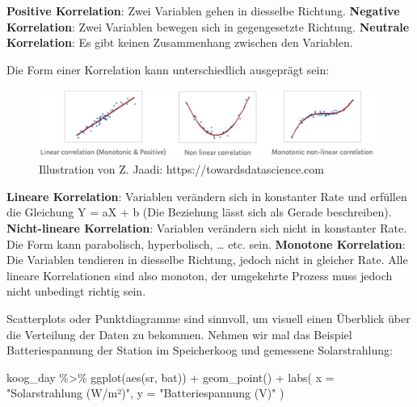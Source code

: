 \documentclass[
]{article}
\newenvironment{Shaded}{\begin{snugshade}}{\end{snugshade}}
\newcommand{\AttributeTok}[1]{\textcolor[rgb]{0.77,0.63,0.00}{#1}}
\newcommand{\FunctionTok}[1]{\textcolor[rgb]{0.00,0.00,0.00}{#1}}
\newcommand{\NormalTok}[1]{#1}
\newcommand{\SpecialCharTok}[1]{\textcolor[rgb]{0.00,0.00,0.00}{#1}}
\newcommand{\StringTok}[1]{\textcolor[rgb]{0.31,0.60,0.02}{#1}}
\begin{document}
\textbf{Positive Korrelation}: Zwei Variablen gehen in diesselbe Richtung.
\textbf{Negative Korrelation}: Zwei Variablen bewegen sich in gegengesetzte Richtung.
\textbf{Neutrale Korrelation}: Es gibt keinen Zusammenhang zwischen den Variablen.

Die Form einer Korrelation kann unterschiedlich ausgeprägt sein:

\begin{figure}

{\centering \includegraphics[width=9.72in]{images/056} 

}

\caption{Illustration von Z. Jaadi: https://towardsdatascience.com}\label{fig:unnamed-chunk-259}
\end{figure}

\textbf{Lineare Korrelation}: Variablen verändern sich in konstanter Rate und erfüllen die Gleichung Y = aX + b (Die Beziehung lässt sich als Gerade beschreiben).
\textbf{Nicht-lineare Korrelation}: Variablen verändern sich nicht in konstanter Rate. Die Form kann parabolisch, hyperbolisch, \ldots{} etc. sein.
\textbf{Monotone Korrelation}: Die Variablen tendieren in diesselbe Richtung, jedoch nicht in gleicher Rate. Alle lineare Korrelationen sind also monoton, der umgekehrte Prozess muss jedoch nicht unbedingt richtig sein.

Scatterplots oder Punktdiagramme sind sinnvoll, um visuell einen Überblick über die Verteilung der Daten zu bekommen. Nehmen wir mal das Beispiel Batteriespannung der Station im Speicherkoog und gemessene Solarstrahlung:

\begin{Shaded}
\begin{Highlighting}[]
\NormalTok{koog\_day }\SpecialCharTok{\%\textgreater{}\%}
  \FunctionTok{ggplot}\NormalTok{(}\FunctionTok{aes}\NormalTok{(sr, bat)) }\SpecialCharTok{+}
  \FunctionTok{geom\_point}\NormalTok{() }\SpecialCharTok{+}
  \FunctionTok{labs}\NormalTok{(}
    \AttributeTok{x =} \StringTok{"Solarstrahlung (W/m²)"}\NormalTok{,}
    \AttributeTok{y =} \StringTok{"Batteriespannung (V)"}
\NormalTok{  )}
\end{Highlighting}
\end{Shaded}
\end{document}
